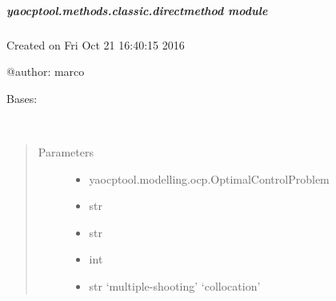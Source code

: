 \documentclass[letterpaper,10pt,english]{sphinxmanual}
\begin{document}
\subparagraph{yaocptool.methods.classic.directmethod module}
\label{\detokenize{yaocptool.methods.classic:module-yaocptool.methods.classic.directmethod}}\label{\detokenize{yaocptool.methods.classic:yaocptool-methods-classic-directmethod-module}}
Created on Fri Oct 21 16:40:15 2016

@author: marco

\begin{fulllineitems}
\label{\detokenize{yaocptool.methods.classic:yaocptool.methods.classic.directmethod.DirectMethod}}
Bases: {\hyperref[\detokenize{yaocptool.methods.base:yaocptool.methods.base.solutionmethodsbase.SolutionMethodsBase}]{}}

\begin{fulllineitems}
\label{\detokenize{yaocptool.methods.classic:yaocptool.methods.classic.directmethod.DirectMethod.__init__}}~\begin{quote}\begin{description}
\item[{Parameters}] \leavevmode\begin{itemize}
\item {} 
 \textendash{} yaocptool.modelling.ocp.OptimalControlProblem

\item {} 
 \textendash{} str

\item {} 
 \textendash{} str

\item {} 
 \textendash{} int

\item {} 
 \textendash{} str ‘multiple-shooting’ \textbar{} ‘collocation’


\end{itemize}
\end{description}
\end{quote}
\end{fulllineitems}
\end{fulllineitems}
\end{document}
